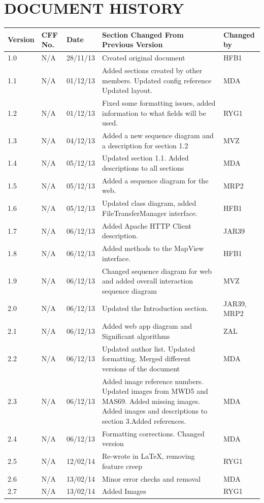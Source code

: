 \documentclass[12pt]{article}
\begin{document}
\section{DOCUMENT HISTORY}
\setlength\LTleft{-0.5cm}
\begin{longtable}{|p{1.3cm}|p{1.5cm}|p{2cm}|p{7cm}| p{2cm}|}
\hline
	Version & CFF No. & Date & Section Changed From Previous Version & Changed by \\
\hline
	1.0 & N/A & 28/11/13 & Created original document & HFB1 \\ 
\hline
	1.1 & N/A & 01/12/13 & Added sections created by other members. 
Updated config reference 
Updated layout. & MDA
 \\
\hline
	1.2 & N/A & 01/12/13 & Fixed some formatting issues, added information to what fields will be used. & RYG1 \\
\hline 
	1.3 & N/A & 04/12/13 & Added a new sequence diagram and a description for section 1.2 & MVZ
\\
\hline 
	1.4 & N/A & 05/12/13 & Updated section 1.1. Added descriptions to all sections & MDA \\
\hline 
	1.5 & N/A & 05/12/13 & Added a sequence diagram for the web.
 & MRP2 \\
\hline
	1.6 & N/A & 05/12/13 & Updated class diagram, added FileTransferManager interface. & HFB1 \\
\hline 
	1.7 & N/A & 06/12/13 & Added Apache HTTP Client description. & JAR39 \\
\hline 
	1.8 & N/A & 06/12/13 & Added methods to the MapView interface. & HFB1
 \\
\hline	
	1.9 &N/A&06/12/13&Changed sequence diagram for web and added
overall interaction sequence diagram & MVZ\\
\hline 
	2.0&N/A&06/12/13&Updated the Introduction section.&JAR39,
MRP2 \\
\hline
	2.1&N/A&06/12/13&Added web app diagram and Significant algorithms &ZAL \\
\hline 
	2.2&N/A&06/12/13&Updated author list. Updated formatting. Merged different versions of the document&MDA\\
\hline
	2.3&N/A&06/12/13& Added image reference numbers. Updated images 
from MWD5 and MAS69. Added missing images. Added images and descriptions to section 3.Added references. & MDA\\
\hline 
	2.4&N/A&06/12/13&Formatting corrections. Changed version&MDA \\
\hline 
	2.5&N/A&12/02/14&Re-wrote in LaTeX, removing feature creep &RYG1 \\
\hline
	2.6&N/A&13/02/14&Minor error checks and removal &MDA \\
 \hline
 	2.7&N/A&13/02/14&Added Images & RYG1\\
 \hline
\end{longtable}
\end{document}
